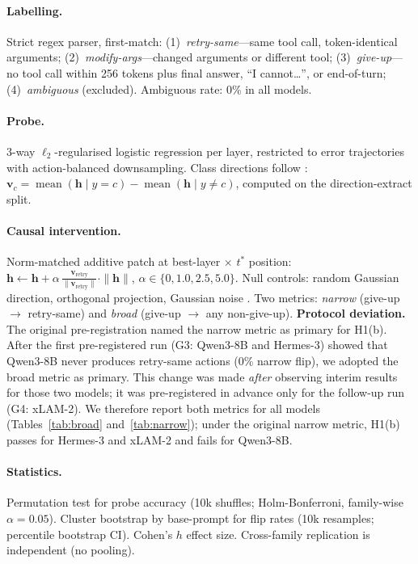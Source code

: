 \documentclass{article}
\begin{document}
\paragraph{Labelling.}
Strict regex parser, first-match: (1)~\textit{retry-same}---same tool
call, token-identical arguments; (2)~\textit{modify-args}---changed
arguments or different tool; (3)~\textit{give-up}---no tool call within
256 tokens plus final answer, ``I cannot\ldots'', or end-of-turn;
(4)~\textit{ambiguous} (excluded).  Ambiguous rate: 0\% in all models.

\paragraph{Probe.}
3-way $\ell_2$-regularised logistic regression per layer, restricted
to error trajectories with action-balanced downsampling.
Class directions follow \citet{zou2023representation}:
$\mathbf{v}_c = \operatorname{mean}(\mathbf{h}\mid y{=}c)
             - \operatorname{mean}(\mathbf{h}\mid y{\neq}c)$,
computed on the direction-extract split.

\paragraph{Causal intervention.}
Norm-matched additive patch at best-layer $\times$ $t^*$ position:
$\mathbf{h} \leftarrow \mathbf{h}
  + \alpha\,\frac{\mathbf{v}_\text{retry}}{\|\mathbf{v}_\text{retry}\|}
  \cdot\|\mathbf{h}\|$,
$\alpha\in\{0, 1.0, 2.5, 5.0\}$.
Null controls: random Gaussian direction, orthogonal projection,
Gaussian noise \citep{heimersheim2024activation}.
Two metrics: \emph{narrow} (give-up $\to$ retry-same) and \emph{broad}
(give-up $\to$ any non-give-up).
\textbf{Protocol deviation.} The original pre-registration named the
narrow metric as primary for H1(b). After the first pre-registered run
(G3: Qwen3-8B and Hermes-3) showed that Qwen3-8B never produces
retry-same actions (0\% narrow flip), we adopted the broad metric as
primary. This change was made \emph{after} observing interim results
for those two models; it was pre-registered in advance only for the
follow-up run (G4: xLAM-2). We therefore report both metrics for all
models (Tables~\ref{tab:broad} and~\ref{tab:narrow}); under the
original narrow metric, H1(b) passes for Hermes-3 and xLAM-2 and fails
for Qwen3-8B.

\paragraph{Statistics.}
Permutation test for probe accuracy (10k shuffles; Holm-Bonferroni,
family-wise $\alpha{=}0.05$).  Cluster bootstrap by base-prompt for
flip rates (10k resamples; percentile bootstrap CI).  Cohen's $h$ effect size.
Cross-family replication is independent (no pooling).
\end{document}
